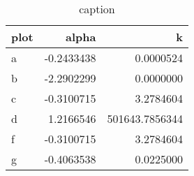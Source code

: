 \begin{table}[ht]
\centering
\begin{tabular}{lrr}
  \hline
plot & alpha & k \\ 
  \hline
a & -0.2433438 & 0.0000524 \\ 
  b & -2.2902299 & 0.0000000 \\ 
  c & -0.3100715 & 3.2784604 \\ 
  d & 1.2166546 & 501643.7856344 \\ 
  f & -0.3100715 & 3.2784604 \\ 
  g & -0.4063538 & 0.0225000 \\ 
   \hline
\end{tabular}
\caption{caption} 
\label{tab:fitting_insideLambda_firstModel_phi1_nm400_dynamic_oneToOne_allowUnlinked}
\end{table}
